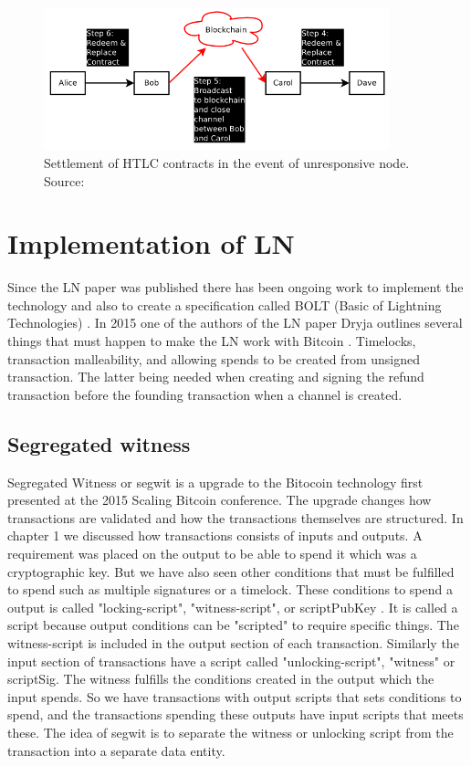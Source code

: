\documentclass[informationsecurity]{gucmasterproject}
\begin{document}
\begin{figure}[h]
    \centering
    \includegraphics[width=10cm]{figs/htlc_bc.png}
    \caption{ Settlement of HTLC contracts in the event of unresponsive node. Source: \cite{poon2015bitcoin}}
    \label{fig:htlc_bc}
\end{figure}


\chapter{Implementation of LN}

Since the LN paper was published \cite{poon2015bitcoin} there has been ongoing work to implement the technology\cite{LN_imp1}\cite{LN_imp2}\cite{LN_imp3} and also to create a specification called BOLT (Basic of Lightning Technologies) \cite{LN_spec}. In 2015 one of the authors of the LN paper Dryja outlines several things that must happen to make the LN work with Bitcoin \cite{SB_bip}. Timelocks, transaction malleability, and allowing spends to be created from unsigned transaction.
The latter being needed when creating and signing the refund transaction before the founding transaction when a channel is created.




\section{Segregated witness}
Segregated Witness or segwit is a upgrade to the Bitocoin technology first presented at the 2015 Scaling Bitcoin conference\cite{SB_segwit}. The upgrade changes how transactions are validated and how the transactions themselves are structured.
In chapter 1 we discussed how transactions consists of inputs and outputs. A requirement was placed on the output to be able to spend it which was a cryptographic key. But we have also seen other conditions that must be fulfilled to spend such as multiple signatures or a timelock. These conditions to spend a output is called "locking-script", "witness-script", or scriptPubKey \cite{antonopoulos2017mastering}. It is called a script because output conditions can be "scripted" to require specific things. The witness-script is included in the output section of each transaction. Similarly the input section of transactions have a script called "unlocking-script", "witness" or scriptSig. The witness fulfills the conditions created in the output which the input spends. So we have transactions with output scripts that sets conditions to spend, and the transactions spending these outputs have input scripts that meets these. The idea of segwit is to separate the witness or unlocking script from the transaction into a separate data entity. 
\end{document}
